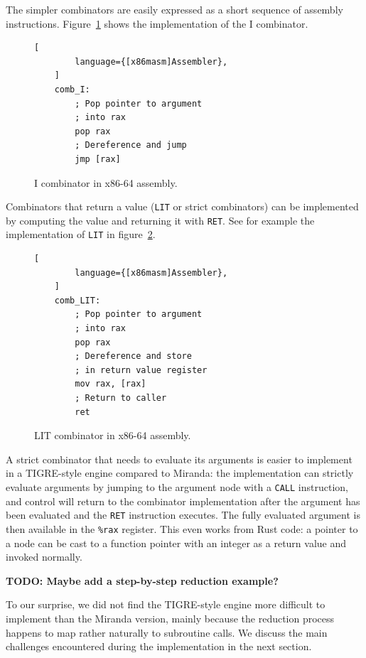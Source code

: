 \documentclass[conference]{IEEEtran}
\begin{document}
The simpler combinators are easily expressed as a short sequence of assembly instructions.
Figure~\ref{fig:combI} shows the implementation of the I combinator.

\begin{figure}
    \begin{lstlisting}[
        language={[x86masm]Assembler},
    ]
    comb_I:
        ; Pop pointer to argument
        ; into rax
        pop rax
        ; Dereference and jump
        jmp [rax]
    \end{lstlisting}
    \centering
    \caption{I combinator in x86-64 assembly.}
    \label{fig:combI}
\end{figure}

Combinators that return a value (\texttt{LIT} or strict combinators) can be implemented by computing the value and returning it with \texttt{RET}.
See for example the implementation of \texttt{LIT} in figure~\ref{fig:combLIT}.

\begin{figure}
    \begin{lstlisting}[
        language={[x86masm]Assembler},
    ]
    comb_LIT:
        ; Pop pointer to argument
        ; into rax
        pop rax
        ; Dereference and store 
        ; in return value register
        mov rax, [rax]
        ; Return to caller
        ret
    \end{lstlisting}
    \centering
    \caption{LIT combinator in x86-64 assembly.}
    \label{fig:combLIT}
\end{figure}

A strict combinator that needs to evaluate its arguments is easier to implement in a TIGRE-style engine compared to Miranda: the implementation can strictly evaluate arguments by jumping to the argument node with a \texttt{CALL} instruction, and control will return to the combinator implementation after the argument has been evaluated and the \texttt{RET} instruction executes.
The fully evaluated argument is then available in the \texttt{\%rax} register.
This even works from Rust code: a pointer to a node can be cast to a function pointer with an integer as a return value and invoked normally.

\textbf{TODO: Maybe add a step-by-step reduction example?}

To our surprise, we did not find the TIGRE-style engine more difficult to implement than the Miranda version, mainly because the reduction process happens to map rather naturally to subroutine calls.
We discuss the main challenges encountered during the implementation in the next section.
\end{document}
